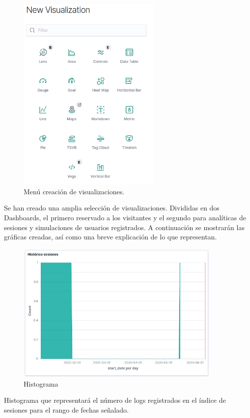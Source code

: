 \documentclass[11pt,a4paper]{book}
\begin{document}
				
				\begin{figure}[H]
					\centering
					\includegraphics[width=7cm, keepaspectratio]{img/visualization_selector.png}
					\caption{Menú creación de visualizaciones.}
					\label{fig:visualization_selector}
				\end{figure}
			
				Se han creado una amplia selección de visualizaciones. Divididas en dos Dashboards, el primero reservado a los visitantes y el segundo para analíticas de sesiones y simulaciones de usuarios registrados. A continuación se mostrarán las gráficas creadas, así como una breve explicación de lo que representan.
				
				\begin{figure}[H]
					\centering
					\includegraphics[width=10cm, keepaspectratio]{img/kibana_01_histogram}
					\caption{Histograma}
					\label{fig:kibana_histogram}
				\end{figure}
				Histograma que representará el número de logs registrados en el índice de sesiones para el rango de fechas señalado.
				
\end{document}
